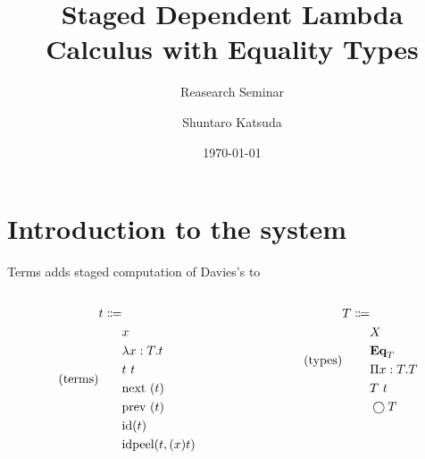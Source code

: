 \documentclass[unicode, aspectratio=169]{beamer}
\title{Staged Dependent Lambda Calculus with Equality Types}
\subtitle{Reasearch Seminar}
\author{Shuntaro Katsuda}
\date{\today}
\institute{Undergraduate School of Informatics, Kyoto University}
\begin{document}
    \frame{\titlepage}

    \section{Introduction to the system}

    \begin{frame}{Terms}
        \lamlfcirc \mysp adds staged computation of Davies's \lamcirc \cite{Davies1996} to  \lamlf \cite{pierce_2005} 
        \begin{columns}
            \begin{column}{.4\textwidth}
                \begin{equation*}\tag{terms}
                    \begin{aligned}
                        t \Coloneqq\\
                        &x\\  
                        &\lambda x: T. t\\
                        &t\text{ } t \\
                        &\textrm{next } (t)\\
                        &\textrm{prev } (t)\\
                        &\textrm{id} (t)\\
                        &\textrm{idpeel} (t, (x)t)\\
                    \end{aligned}
                \end{equation*}
            \end{column}
            
            \begin{column}{.4\textwidth}
                \begin{equation*}\tag{types}
                    \begin{aligned}
                        T \Coloneqq\\
                        &X\\ 
                        &\textbf{Eq}_T\\
                        &\Pi x: T. T\\
                        &T\text{ } t\\
                        &\bigcirc T\\
                    \end{aligned}
                \end{equation*}
            \end{column}
        \end{columns}
    \end{frame}
\end{document}

